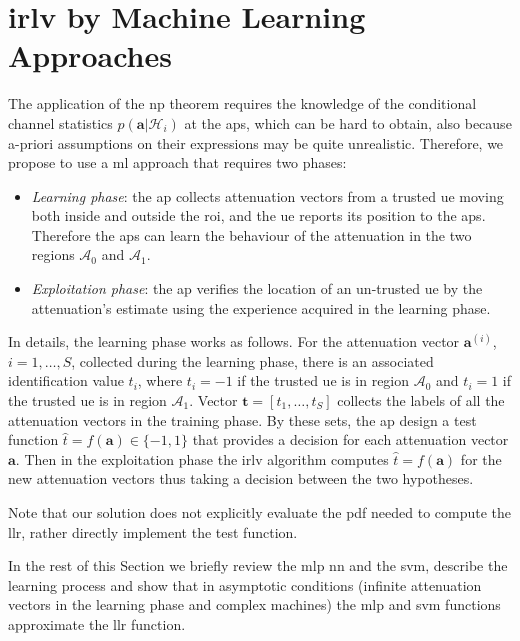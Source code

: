\documentclass[draftcls,onecolumn,12pt]{IEEEtran}
\newcommand{\ai}{\bm{a}^{(i)}}
\begin{document}
\section{\Ac{irlv} by Machine Learning Approaches}


The application of the \ac{np} theorem requires the knowledge of the conditional channel statistics $p(\bm{a}|\mathcal{H}_i)$ at the \acp{ap}, which can be hard to obtain, also because a-priori assumptions on their expressions may be quite unrealistic. 
 Therefore, we propose to use a \ac{ml} approach that requires two phases:
\begin{itemize}
    \item {\em Learning phase}: the \ac{ap} collects attenuation vectors from a trusted \ac{ue} moving both inside and outside the \ac{roi}, and the \ac{ue} reports its position to the \acp{ap}. Therefore the \acp{ap} can learn the behaviour of the attenuation in the two regions $\mathcal A_0$ and $\mathcal A_1$.
    \item {\em Exploitation phase}: the \ac{ap} verifies the location of an un-trusted \ac{ue} by the attenuation's estimate using the experience acquired in the learning phase. 
\end{itemize}

In details, the learning phase works as follows. For the attenuation vector $\ai$,  $i=1, \ldots, S$,  collected during the learning phase, there is an associated identification value $t_i$, where $t_i= -1$ if the trusted \ac{ue} is in region $\mathcal{A}_0$ and $t_i = 1$ if the trusted \ac{ue} is in region $\mathcal{A}_1$. Vector $\bm{t}=[t_1, \ldots, t_S]$ collects the labels of all the  attenuation vectors in the training phase. By these sets, the \ac{ap} design a test function  $\hat{t} = f(\bm{a})\in \{-1, 1\}$ that provides a decision for each attenuation vector $\bm{a}$. Then in the exploitation phase the \ac{irlv} algorithm computes $\hat{t} = f(\bm{a})$ for the new attenuation vectors thus taking a decision between the two hypotheses.  

Note that our solution does not explicitly evaluate the \ac{pdf} needed to compute the \ac{llr}, rather directly implement the test function.

In the rest of this Section we  briefly review the \ac{mlp} \ac{nn} and the \ac{svm}, describe the learning process  and show that in asymptotic conditions (infinite attenuation vectors in the learning phase and complex machines) the \ac{mlp} and \ac{svm} functions approximate the \ac{llr} function.
  
\end{document}
